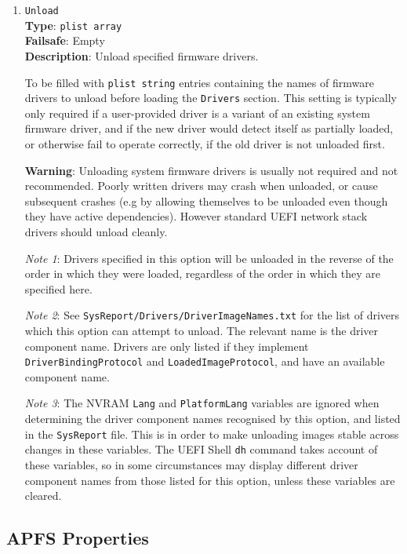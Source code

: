 \documentclass[]{article}
\begin{document}
\begin{enumerate}
\item
  \texttt{Unload}\\
  \textbf{Type}: \texttt{plist\ array}\\
  \textbf{Failsafe}: Empty\\
  \textbf{Description}: Unload specified firmware drivers.

  To be filled with \texttt{plist\ string} entries containing
  the names of firmware drivers to unload before loading the
  \texttt{Drivers} section.
  This setting is typically only required if a user-provided driver is a variant of
  an existing system firmware driver, and if the new driver would detect itself
  as partially loaded, or otherwise fail to operate correctly, if the old
  driver is not unloaded first.

  \textbf{Warning}: Unloading system firmware drivers is usually not required
  and not recommended. Poorly written drivers may crash when
  unloaded, or cause subsequent crashes (e.g by allowing themselves to be
  unloaded even though they have active dependencies). However standard UEFI
  network stack drivers should unload cleanly.

  \emph{Note 1}: Drivers specified in this option will be unloaded in the reverse
  of the order in which they were loaded, regardless of the order in which they
  are specified here.

  \emph{Note 2}: See \texttt{SysReport/Drivers/DriverImageNames.txt} for the
  list of drivers which this option can attempt to unload.
  The relevant name is the driver component name. Drivers are only listed if they
  implement \texttt{DriverBindingProtocol} and \texttt{LoadedImageProtocol},
  and have an available component name.

  \emph{Note 3}: The NVRAM \texttt{Lang} and \texttt{PlatformLang} variables
  are ignored when determining the driver component names recognised by this
  option, and listed in the \texttt{SysReport} file. This is in order to make
  unloading images stable across changes in these variables.
  The UEFI Shell \texttt{dh} command takes account of these variables,
  so in some circumstances may display different driver component names from
  those listed for this option, unless these variables are cleared.

\end{enumerate}

\subsection{APFS Properties}\label{uefiapfsprops}
\end{document}
